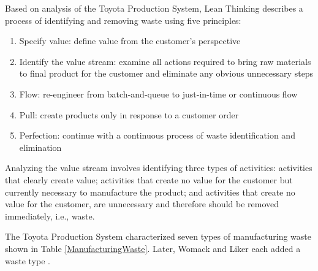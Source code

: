 Based on analysis of the Toyota Production System, Lean Thinking \cite{WomackLeanThinking} describes a process of identifying and removing waste using five principles:
\begin{enumerate}
\item Specify value: define value from the customer's perspective
\item Identify the value stream: examine all actions required to bring raw materials to final product for the customer and eliminate any obvious unnecessary steps
\item Flow: re-engineer from batch-and-queue to just-in-time or continuous flow 
\item Pull: create products only in response to a customer order
\item Perfection: continue with a continuous process of waste identification and elimination
\end{enumerate}

Analyzing the value stream involves identifying three types of activities: activities that clearly create value; activities that create no value for the customer but currently necessary to manufacture the product; and activities that create no value for the customer, are unnecessary and therefore should be removed immediately, i.e., waste.

The Toyota Production System characterized seven types of manufacturing waste \cite{ShingoToyotaProductionSystem} shown in Table \ref{ManufacturingWaste}. Later, Womack and Liker each added a waste type \cite{WomackLeanThinking, LikerToyotaWay}.

